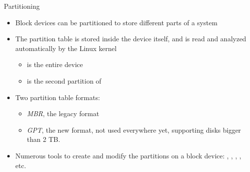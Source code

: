 \begin{frame}{Partitioning}
  \begin{itemize}
  \item Block devices can be partitioned to store different parts of a
    system
  \item The partition table is stored inside the device itself, and is
    read and analyzed automatically by the Linux kernel
    \begin{itemize}
    \item {} is the entire device
    \item {} is the second partition of 
    \end{itemize}
  \item Two partition table formats:
    \begin{itemize}
    \item {\em MBR}, the legacy format
    \item {\em GPT}, the new format, not used everywhere yet, supporting
      disks bigger than 2 TB.
    \end{itemize}
  \item Numerous tools to create and modify the partitions on a block
    device: , , , ,
    etc.
  \end{itemize}
\end{frame}

